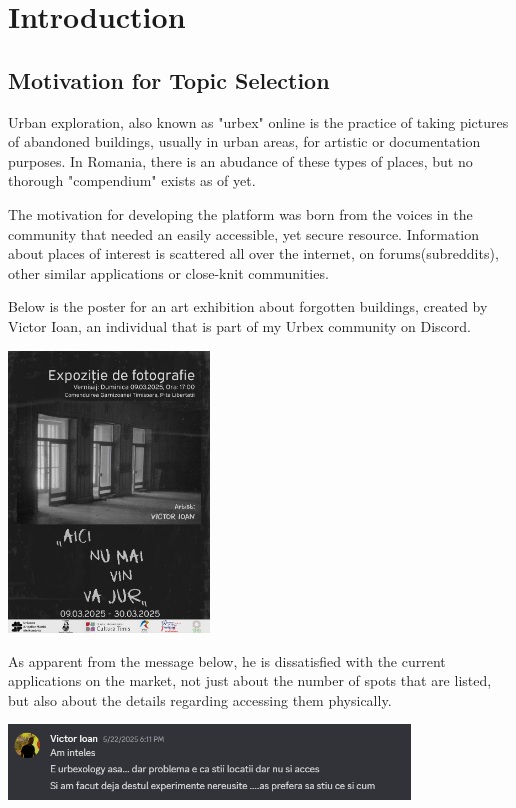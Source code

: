 \documentclass[12pt,a4paper]{report}
\begin{document}
\newpage

\chapter*{Introduction}

\section*{Motivation for Topic Selection}

Urban exploration, also known as "urbex" online is the practice of taking pictures of abandoned buildings, usually in urban areas, for artistic or documentation purposes. In Romania, there is an abudance of these types of places, but no thorough "compendium" exists as of yet.

The motivation for developing the platform was born from the voices in the community that needed an easily accessible, yet secure resource. Information about places of interest is scattered all over the internet, on forums(subreddits), other similar applications or close-knit communities.

Below is the poster for an art exhibition about forgotten buildings, created by Victor Ioan, an individual that is part of my Urbex community on Discord.

\begin{center}
\includegraphics[width=0.4\textwidth]{images/expozitie.jpg}
\end{center}

As apparent from the message below, he is dissatisfied with the current applications on the market, not just about the number of spots that are listed, but also about the details regarding accessing them physically.

\begin{center}
\includegraphics[width=0.8\textwidth]{images/mesaj.png}
\end{center}
\end{document}
